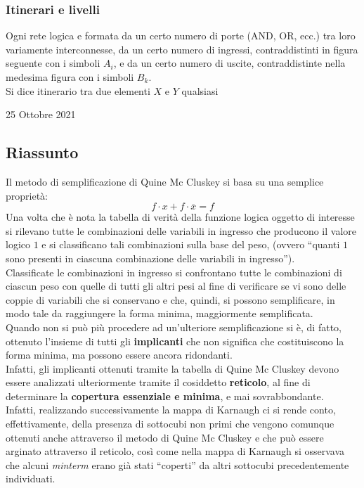 \documentclass[a4paper]{extarticle}
\newcommand{\quotes}[1]{``#1''}
\begin{document}
\subsubsection{Itinerari e livelli}
Ogni rete logica e formata da un certo numero di porte (AND, OR, ecc.) tra loro variamente interconnesse, da un certo numero di ingressi, contraddistinti in figura seguente con i simboli \(A_i\), e da un certo numero di uscite, contraddistinte nella medesima figura con i simboli \(B_k\).\\
Si dice itinerario tra due elementi \(X\) e \(Y\) qualsiasi

\newpage
\begin{center}
    25 Ottobre 2021
\end{center}

\subsection{Riassunto}
Il metodo di semplificazione di Quine Mc Cluskey si basa su una semplice proprietà:
\[f \cdot x + f \cdot \overline{x} = f\]
Una volta che è nota la tabella di verità della funzione logica oggetto di interesse si rilevano tutte le combinazioni delle variabili in ingresso che producono il valore logico \(1\) e si classificano tali combinazioni sulla base del peso, (ovvero \quotes{quanti \(1\) sono presenti in ciascuna combinazione delle variabili in ingresso}).\\
Classificate le combinazioni in ingresso si confrontano tutte le combinazioni di ciascun peso con quelle di tutti gli altri pesi al fine di verificare se vi sono delle coppie di variabili che si conservano e che, quindi, si possono semplificare, in modo tale da raggiungere la forma minima, maggiormente semplificata.\\
Quando non si può più procedere ad un'ulteriore semplificazione si è, di fatto, ottenuto l'insieme di tutti gli \textbf{implicanti} che non significa che costituiscono la forma minima, ma possono essere ancora ridondanti.\\
Infatti, gli implicanti ottenuti tramite la tabella di Quine Mc Cluskey devono essere analizzati ulteriormente tramite il cosiddetto \textbf{reticolo}, al fine di determinare la \textbf{copertura essenziale e minima}, e mai sovrabbondante.\\
Infatti, realizzando successivamente la mappa di Karnaugh ci si rende conto, effettivamente, della presenza di sottocubi non primi che vengono comunque ottenuti anche attraverso il metodo di Quine Mc Cluskey e che può essere arginato attraverso il reticolo, così come nella mappa di Karnaugh si osservava che alcuni \textit{minterm} erano già stati \quotes{coperti} da altri sottocubi precedentemente individuati.
\end{document}
